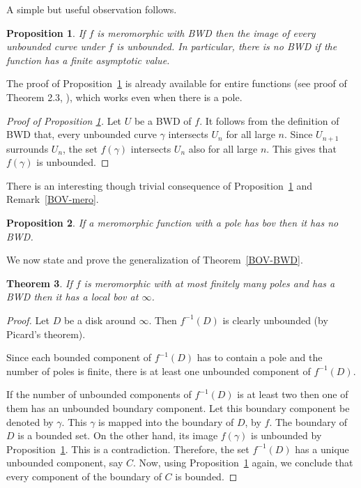 \documentclass[11pt,a4paper]{article}
\newtheorem{theorem}{Theorem}[section]
\newtheorem{prop}[theorem]{Proposition}
\begin{document}
 A simple but useful observation follows.
	\begin{prop}
		If $f$ is meromorphic with BWD then the image of every unbounded curve under $f$ is unbounded.  In particular, there is no BWD if the function  has a finite asymptotic value.
		\label{unbounded-BWD}
	\end{prop}
		The proof of Proposition~\ref{unbounded-BWD} is already available for entire functions (see proof of Theorem 2.3, \cite{ChakraChakrabortyNayak 2016}), which  works even when there is a pole.
	\begin{proof}[Proof of Proposition \ref{unbounded-BWD}]
		Let $U$ be a BWD of $f$. It follows from the definition of BWD that,  every unbounded curve $\gamma$  intersects $U_n$ for all large $n $. Since  $U_{n+1}$ surrounds $U_n$, the set $f(\gamma)$ intersects  $U_n$ also for all large $n$. This gives that $f(\gamma)$ is unbounded.
	\end{proof}
		There is an interesting though trivial consequence of Proposition~\ref{unbounded-BWD} and Remark~\ref{BOV-mero}.
	\begin{prop}
		If a meromorphic function with a pole has bov then it has no BWD. 
	\end{prop}
	We now state and prove the generalization of Theorem~\ref{BOV-BWD}.
	\begin{theorem}
		If $f$ is meromorphic with at most finitely many poles and has a BWD then it has a local bov at $\infty$.
		\label{BWD-LOCALBOV}
	\end{theorem}
	\begin{proof} Let $D$ be a disk around $\infty$. Then $f^{-1}(D)$ is clearly unbounded (by Picard's theorem). 
		\par
		
		Since each bounded component of $f^{-1}(D)$ has to contain a pole and the number of poles is finite, there is at least one unbounded component of $f^{-1}(D)$. 
		
		\par	
		If the number of unbounded components of $f^{-1}(D)$ is at least two  then one of them has an unbounded boundary component. Let this boundary component be denoted by $\gamma$. This $\gamma$ is mapped into the boundary of $D$,  by $f$. The boundary of $D$ is a bounded set. On the other hand, its image $f(\gamma)$ is unbounded by Proposition~\ref{unbounded-BWD}. This is a contradiction.
		Therefore, the set $f^{-1}(D)$ has a unique  unbounded component, say $C$. Now, using Proposition~\ref{unbounded-BWD} again, we conclude that every component of the boundary of $C$ is  bounded.
	\end{proof} 
\end{document}
